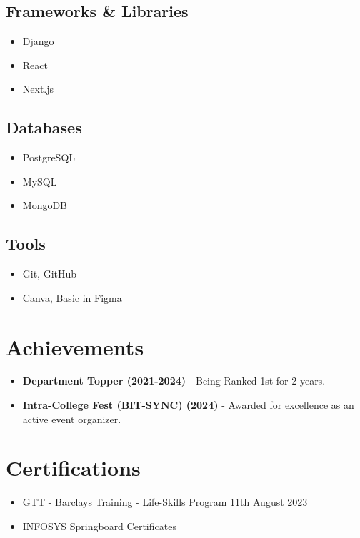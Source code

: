 \documentclass[11pt]{article}
\begin{document}
\subsection{Frameworks \& Libraries}
\begin{itemize}
    \item Django
    \item React
    \item Next.js
\end{itemize}

\subsection{Databases}
\begin{itemize}
    \item PostgreSQL
    \item MySQL
    \item MongoDB
\end{itemize}

\subsection{Tools}
\begin{itemize}
    \item Git, GitHub
    \item Canva, Basic in Figma
\end{itemize}

\section{Achievements}
\begin{itemize}
    \item[\faCertificate] \textbf{Department Topper (2021-2024)} - Being Ranked 1st for 2 years.
    \item[\faTrophy] \textbf{Intra-College Fest (BIT-SYNC) (2024)} - Awarded for excellence as an active event organizer.
\end{itemize}
\section{Certifications}
\begin{itemize}
    \item GTT - Barclays Training - Life-Skills Program 11th August 2023
    \item INFOSYS Springboard Certificates
\end{itemize}
\end{document}
